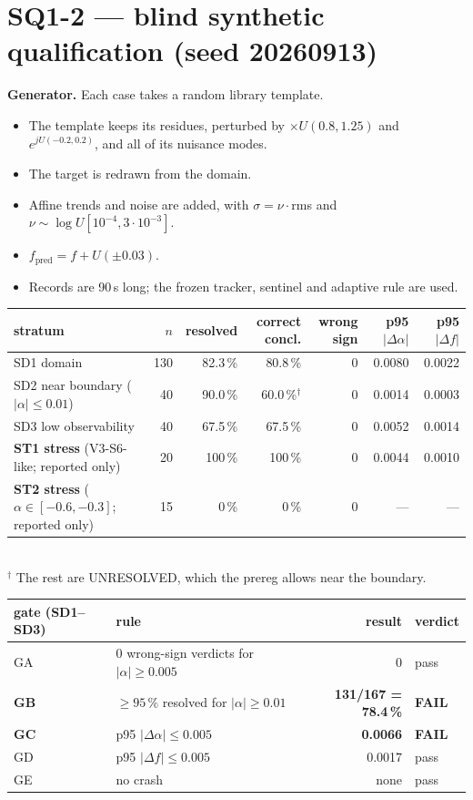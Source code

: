 \documentclass[10pt,a4paper]{article}
\begin{document}
\section{SQ1-2 --- blind synthetic qualification (seed 20260913)}
\textbf{Generator.} Each case takes a random library template.
\begin{itemize}
\item The template keeps its residues, perturbed by $\times U(0.8,1.25)$ and $e^{jU(-0.2,0.2)}$, and all of its nuisance modes.
\item The target is redrawn from the domain.
\item Affine trends and noise are added, with $\sigma=\nu\cdot$rms and $\nu\sim\log U[10^{-4},3\cdot10^{-3}]$.
\item $f_\text{pred}=f+U(\pm0.03)$.
\item Records are 90\,s long; the frozen tracker, sentinel and adaptive rule are used.
\end{itemize}

\medskip
\noindent\begin{tabularx}{\linewidth}{@{}Yrrrrrr@{}}
\toprule
stratum & $n$ & resolved & correct concl. & wrong sign & p95 $|\Delta\alpha|$ & p95 $|\Delta f|$\\
\midrule
SD1 domain & 130 & 82.3\,\% & 80.8\,\% & 0 & 0.0080 & 0.0022\\
SD2 near boundary ($|\alpha|\le0.01$) & 40 & 90.0\,\% & 60.0\,\%$^\dagger$ & 0 & 0.0014 & 0.0003\\
SD3 low observability & 40 & 67.5\,\% & 67.5\,\% & 0 & 0.0052 & 0.0014\\
\textbf{ST1 stress} (V3-S6-like; reported only) & 20 & 100\,\% & 100\,\% & 0 & 0.0044 & 0.0010\\
\textbf{ST2 stress} ($\alpha\in[-0.6,-0.3]$; reported only) & 15 & 0\,\% & 0\,\% & 0 & --- & ---\\
\bottomrule
\end{tabularx}\\
{\small $^\dagger$ The rest are UNRESOLVED, which the prereg allows near the boundary.}

\medskip
\noindent\begin{tabularx}{\linewidth}{@{}lYrl@{}}
\toprule
gate (SD1--SD3) & rule & result & verdict\\
\midrule
GA & 0 wrong-sign verdicts for $|\alpha|\ge0.005$ & 0 & pass\\
\textbf{GB} & $\ge95\,\%$ resolved for $|\alpha|\ge0.01$ & \textbf{131/167 = 78.4\,\%} & \textbf{FAIL}\\
\textbf{GC} & p95 $|\Delta\alpha|\le0.005$ & \textbf{0.0066} & \textbf{FAIL}\\
GD & p95 $|\Delta f|\le0.005$ & 0.0017 & pass\\
GE & no crash & none & pass\\
\bottomrule
\end{tabularx}
\end{document}
